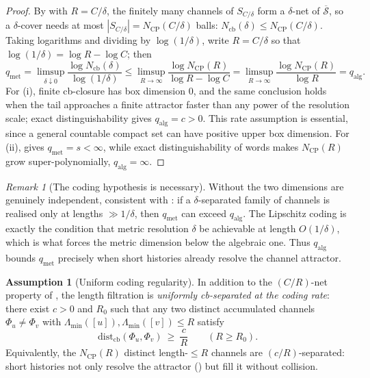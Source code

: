 \documentclass[11pt]{article}
\theoremstyle{definition}
\newtheorem{assumption}{Assumption}[section]
\theoremstyle{remark}
\newtheorem{remark}[theorem]{Remark}
\newcommand{\CP}{\mathrm{CP}}
\newcommand{\qalg}{q_{\mathrm{alg}}}
\newcommand{\qmet}{q_{\mathrm{met}}}
\newcommand{\Lam}{\Lambda}
\newcommand{\cb}{\mathrm{cb}}
\begin{document}
\begin{proof}
By  with $R=C/\delta$, the finitely many channels of
$S_{C/\delta}$ form a $\delta$-net of $\overline{\mathcal S}$, so a $\delta$-cover
needs at most $|S_{C/\delta}|=N_{\CP}(C/\delta)$ balls:
$N_{\cb}(\delta)\le N_{\CP}(C/\delta)$.  Taking logarithms and dividing by
$\log(1/\delta)$, write $R=C/\delta$ so that $\log(1/\delta)=\log R-\log C$; then
\[
  \qmet=\limsup_{\delta\downarrow0}\frac{\log N_{\cb}(\delta)}{\log(1/\delta)}
  \le\limsup_{R\to\infty}\frac{\log N_{\CP}(R)}{\log R-\log C}
  =\limsup_{R\to\infty}\frac{\log N_{\CP}(R)}{\log R}=\qalg .
\]
For (i), finite cb-closure has box dimension $0$, and the same conclusion holds
when the tail approaches a finite attractor faster than any power of the
resolution scale; exact distinguishability gives $\qalg=c>0$.  This rate
assumption is essential, since a general countable compact set can have positive
upper box dimension.  For (ii), 
gives $\qmet=s<\infty$, while exact distinguishability of words makes
$N_{\CP}(R)$ grow super-polynomially, $\qalg=\infty$.
\end{proof}

\begin{remark}[The coding hypothesis is necessary]
\label{rem:coding-necessary}
Without  the two dimensions are genuinely independent,
consistent with : if a $\delta$-separated family of
channels is realised only at lengths $\gg1/\delta$, then $\qmet$ can exceed
$\qalg$.  The Lipschitz coding is exactly the condition that metric resolution
$\delta$ be achievable at length $O(1/\delta)$, which is what forces the metric
dimension below the algebraic one.  Thus $\qalg$ bounds $\qmet$ precisely when
short histories already resolve the channel attractor.
\end{remark}

\begin{assumption}[Uniform coding regularity]
\label{ass:uniform-separation}
In addition to the $(C/R)$-net property of , the
length filtration is \emph{uniformly cb-separated at the coding rate}: there
exist $c>0$ and $R_0$ such that any two distinct accumulated channels
$\Phi_u\neq\Phi_v$ with $\Lam_{\min}([u]),\Lam_{\min}([v])\le R$ satisfy
\[
  \mathrm{dist}_{\cb}(\Phi_u,\Phi_v)\ \ge\ \frac{c}{R}\qquad(R\ge R_0).
\]
Equivalently, the $N_{\CP}(R)$ distinct length-$\le R$ channels are
$(c/R)$-separated: short histories not only resolve the attractor
\textup{(}\textup{)} but fill it without collision.
\end{assumption}
\end{document}
